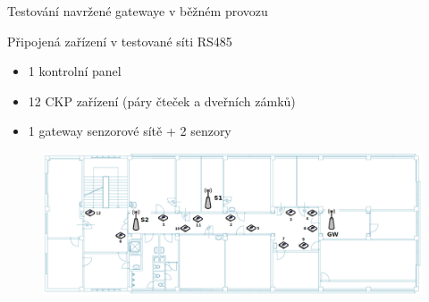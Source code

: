 \documentclass{beamer}
\begin{document}
\begin{frame} {Testování navržené gatewaye v běžném provozu}

	Připojená zařízení v testované síti RS485
	\begin{itemize}
		\item 1 kontrolní panel
		\item 12 CKP zařízení (páry čteček a dveřních zámků)
		\item 1 gateway senzorové sítě + 2 senzory
	\end{itemize}


	\begin{figure}[!h]
		\centering
		\includegraphics[width=1\textwidth]{5patro}
	\end{figure}

\end{frame}


		
		
\end{document}
